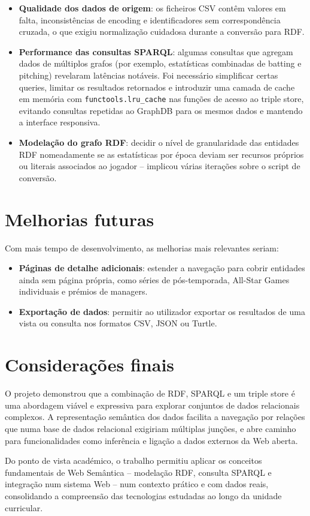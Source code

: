 \begin{itemize}[leftmargin=*]
  \item \textbf{Qualidade dos dados de origem}: os ficheiros CSV cont\^em valores em falta, inconsist\^encias de encoding e identificadores sem correspondência cruzada, o que exigiu normaliza\c{c}\~ao cuidadosa durante a convers\~ao para RDF.
  \item \textbf{Performance das consultas SPARQL}: algumas consultas que agregam dados de m\'ultiplos grafos (por exemplo, estat\'isticas combinadas de batting e pitching) revelaram lat\^encias not\'aveis. Foi necess\'ario simplificar certas queries, limitar os resultados retornados e introduzir uma camada de cache em mem\'oria com \texttt{functools.lru\_cache} nas fun\c{c}\~oes de acesso ao triple store, evitando consultas repetidas ao GraphDB para os mesmos dados e mantendo a interface responsiva.
  \item \textbf{Modelação do grafo RDF}: decidir o n\'ivel de granularidade das entidades RDF nomeadamente se as estat\'isticas por época deviam ser recursos pr\'oprios ou literais associados ao jogador -- implicou v\'arias itera\c{c}\~oes sobre o script de convers\~ao.
\end{itemize}

\section{Melhorias futuras}

Com mais tempo de desenvolvimento, as melhorias mais relevantes seriam:

\begin{itemize}[leftmargin=*]
  \item \textbf{P\'aginas de detalhe adicionais}: estender a navega\c{c}\~ao para cobrir entidades ainda sem p\'agina pr\'opria, como s\'eries de p\'os-temporada, All-Star Games individuais e pr\'emios de managers.
  \item \textbf{Exporta\c{c}\~ao de dados}: permitir ao utilizador exportar os resultados de uma vista ou consulta nos formatos CSV, JSON ou Turtle.
\end{itemize}

\section{Considera\c{c}\~oes finais}

O projeto demonstrou que a combina\c{c}\~ao de RDF, SPARQL e um triple store \'{e} uma abordagem vi\'avel e expressiva para explorar conjuntos de dados relacionais complexos. A representa\c{c}\~ao sem\^antica dos dados facilita a navega\c{c}\~ao por rela\c{c}\~oes que numa base de dados relacional exigiriam m\'ultiplas jun\c{c}\~oes, e abre caminho para funcionalidades como infer\^encia e liga\c{c}\~ao a dados externos da Web aberta.

Do ponto de vista acad\'emico, o trabalho permitiu aplicar os conceitos fundamentais de Web Sem\^antica -- modelação RDF, consulta SPARQL e integra\c{c}\~ao num sistema Web -- num contexto pr\'atico e com dados reais, consolidando a compreens\~ao das tecnologias estudadas ao longo da unidade curricular.
